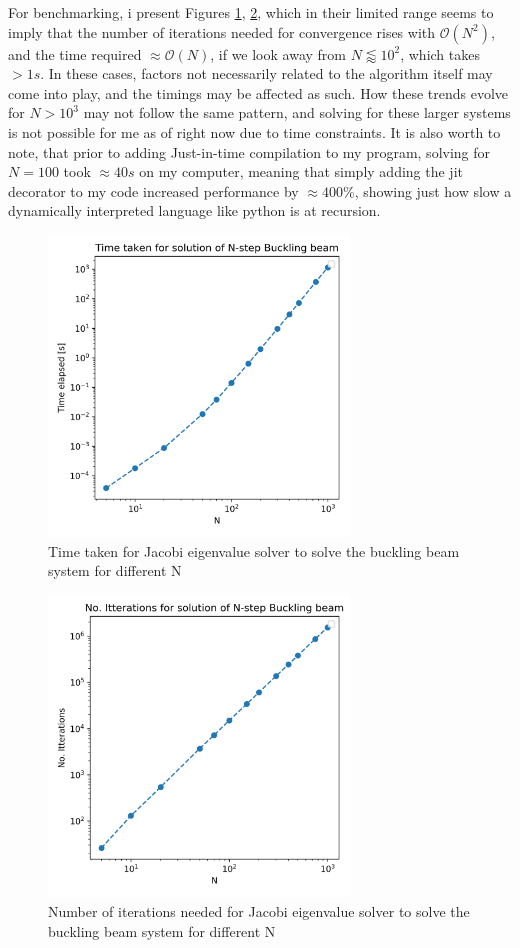 \documentclass[10pt,showpacs,preprintnumbers,footinbib,amsmath,amssymb,aps,prl,twocolumn,groupedaddress,superscriptaddress,showkeys]{revtex4-1}
\begin{document}
  For benchmarking, i present Figures \ref{fig:time}, \ref{fig:count}, which in their limited range seems to imply that the number of iterations needed for convergence rises with $\mathcal O(N^2)$, and the time required $\approx \mathcal O(N)$, if we look away from $N\lessapprox 10^2$, which takes $>1s$. In these cases, factors not necessarily related to the algorithm itself may come into play, and the timings may be affected as such. How these trends evolve for $N>10^3$ may not follow the same pattern, and solving for these larger systems is not possible for me as of right now due to time constraints. It is also worth to note, that prior to adding Just-in-time compilation to my program, solving for $N=100$ took $\approx 40s$ on my computer, meaning that simply adding the jit decorator to my code increased performance by $\approx 400\%$, showing just how slow a dynamically interpreted language like python is at recursion.

  \begin{figure}[h!]
    \center
    \includegraphics[width=8cm]{figs/q2c_timeloglog.png}
    \caption{Time taken for Jacobi eigenvalue solver to solve the buckling beam system for different N}
    \label{fig:time}
  \end{figure}

  \begin{figure}[h!]
    \center
    \includegraphics[width=8cm]{figs/q2c_countloglog.png}
    \caption{Number of iterations needed for Jacobi eigenvalue solver to solve the buckling beam system for different N}
    \label{fig:count}
  \end{figure}
\end{document}
